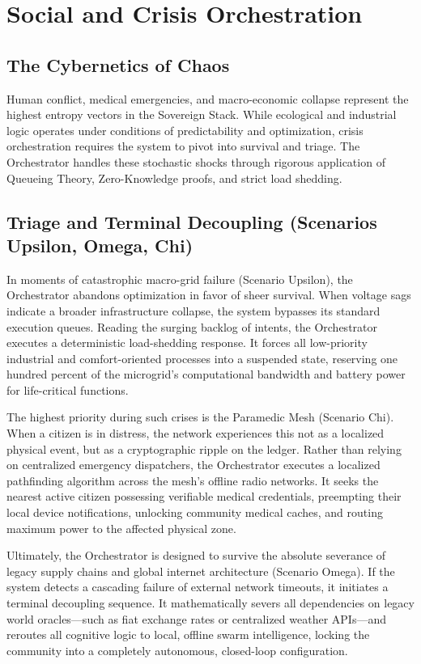 \chapter{Social and Crisis Orchestration}

\section{The Cybernetics of Chaos}
Human conflict, medical emergencies, and macro-economic collapse represent the highest entropy vectors in the Sovereign Stack. While ecological and industrial logic operates under conditions of predictability and optimization, crisis orchestration requires the system to pivot into survival and triage. The Orchestrator handles these stochastic shocks through rigorous application of Queueing Theory, Zero-Knowledge proofs, and strict load shedding.

\section{Triage and Terminal Decoupling (Scenarios Upsilon, Omega, Chi)}
In moments of catastrophic macro-grid failure (Scenario Upsilon), the Orchestrator abandons optimization in favor of sheer survival. When voltage sags indicate a broader infrastructure collapse, the system bypasses its standard execution queues. Reading the surging backlog of intents, the Orchestrator executes a deterministic load-shedding response. It forces all low-priority industrial and comfort-oriented processes into a suspended state, reserving one hundred percent of the microgrid's computational bandwidth and battery power for life-critical functions. 

The highest priority during such crises is the Paramedic Mesh (Scenario Chi). When a citizen is in distress, the network experiences this not as a localized physical event, but as a cryptographic ripple on the ledger. Rather than relying on centralized emergency dispatchers, the Orchestrator executes a localized pathfinding algorithm across the mesh's offline radio networks. It seeks the nearest active citizen possessing verifiable medical credentials, preempting their local device notifications, unlocking community medical caches, and routing maximum power to the affected physical zone.

Ultimately, the Orchestrator is designed to survive the absolute severance of legacy supply chains and global internet architecture (Scenario Omega). If the system detects a cascading failure of external network timeouts, it initiates a terminal decoupling sequence. It mathematically severs all dependencies on legacy world oracles—such as fiat exchange rates or centralized weather APIs—and reroutes all cognitive logic to local, offline swarm intelligence, locking the community into a completely autonomous, closed-loop configuration.

